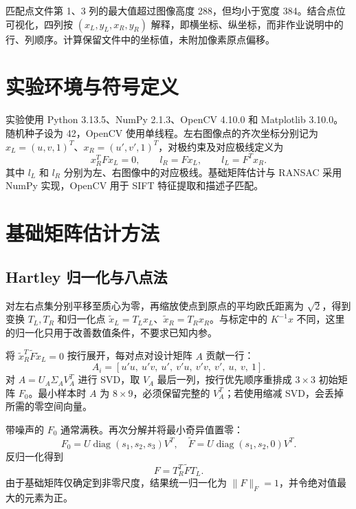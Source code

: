 \documentclass[UTF8,a4paper,zihao=-4,fontset=windows]{ctexart}
\begin{document}
匹配点文件第 1、3 列的最大值超过图像高度 288，但均小于宽度 384。结合点位可视化，四列按 $(x_L,y_L,x_R,y_R)$ 解释，即横坐标、纵坐标，而非作业说明中的行、列顺序。计算保留文件中的坐标值，未附加像素原点偏移。

\section{实验环境与符号定义}
实验使用 Python 3.13.5、NumPy 2.1.3、OpenCV 4.10.0 和 Matplotlib 3.10.0。随机种子设为 42，OpenCV 使用单线程。左右图像点的齐次坐标分别记为 $x_L=(u,v,1)^T$、$x_R=(u',v',1)^T$，对极约束及对应极线定义为
\begin{equation}
x_R^T F x_L=0,\qquad l_R=Fx_L,\qquad l_L=F^T x_R.
\end{equation}
其中 $l_L$ 和 $l_R$ 分别为左、右图像中的对应极线。基础矩阵估计与 RANSAC 采用 NumPy 实现，OpenCV 用于 SIFT 特征提取和描述子匹配。

\clearpage
\section{基础矩阵估计方法}
\subsection{Hartley 归一化与八点法}
对左右点集分别平移至质心为零，再缩放使点到原点的平均欧氏距离为 $\sqrt{2}$，得到变换 $T_L,T_R$ 和归一化点 $\widetilde{x}_L=T_Lx_L$、$\widetilde{x}_R=T_Rx_R$。与标定中的 $K^{-1}x$ 不同，这里的归一化只用于改善数值条件，不要求已知内参。

将 $\widetilde{x}_R^T\widetilde{F}\widetilde{x}_L=0$ 按行展开，每对点对设计矩阵 $A$ 贡献一行：
\begin{equation}
A_i=[u'u,\ u'v,\ u',\ v'u,\ v'v,\ v',\ u,\ v,\ 1].
\end{equation}
对 $A=U_A\Sigma_A V_A^T$ 进行 SVD，取 $V_A$ 最后一列，按行优先顺序重排成 $3\times3$ 初始矩阵 $F_0$。最小样本时 $A$ 为 $8\times9$，必须保留完整的 $V_A^T$；若使用缩减 SVD，会丢掉所需的零空间向量。

带噪声的 $F_0$ 通常满秩。再次分解并将最小奇异值置零：
\begin{equation}
F_0=U\operatorname{diag}(s_1,s_2,s_3)V^T,
\quad \widetilde{F}=U\operatorname{diag}(s_1,s_2,0)V^T.
\end{equation}
反归一化得到
\begin{equation}
F=T_R^T\widetilde{F}T_L.
\end{equation}
由于基础矩阵仅确定到非零尺度，结果统一归一化为 $\lVert F\rVert_F=1$，并令绝对值最大的元素为正。
\end{document}
